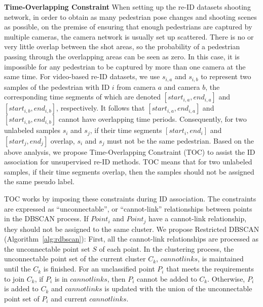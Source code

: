 \documentclass[10pt,twocolumn,letterpaper]{article}
\begin{document}
\noindent \textbf{Time-Overlapping Constraint} 
When setting up the re-ID datasets shooting network, in order to obtain as many pedestrian pose changes and shooting scenes as possible, on the premise of ensuring that enough pedestrians are captured by multiple cameras, the camera network is usually set up scattered. There is no or very little overlap between the shot areas, so the probability of a pedestrian passing through the overlapping areas can be seen as zero. In this case, it is impossible for any pedestrian to be captured by more than one camera at the same time. For video-based re-ID datasets, we use $s_{i,a}$ and $s_{i,b}$ to represent two samples of the pedestrian with ID $i$ from camera $a$ and camera $b$, the corresponding time segments of which are denoted $[start_{i,a}, end_{i,a}]$ and $[start_{i,b}, end_{i,b}]$, respectively. It follows that $[start_{i,a}, end_{i,a}]$ and $[start_{i,b}, end_{i,b}]$ cannot have overlapping time periods. Consequently, for two unlabeled samples $s_i$ and $s_j$, if their time segments $[start_{i}, end_{i}]$ and $[start_{j}, end_{j}]$ overlap, $s_i$ and $s_j$ must not be the same pedestrian. Based on the above analysis, we propose Time-Overlapping Constraint (TOC) to assist the ID association for unsupervised re-ID methods. TOC means that for two unlabeled samples, if their time segments overlap, then the samples should not be assigned the same pseudo label.

TOC works by imposing these constraints during ID association. The constraints are expressed as ``unconnectable'', or ``cannot-link'' relationships between points in the DBSCAN process. If $Point_i$ and $Point_j$ have a cannot-link relationship, they should not be assigned to the same cluster. We propose Restricted DBSCAN (Algorithm~\ref{alg:rdbscan}): First, all the cannot-link relationships are processed as the unconnectable point set $S$ of each point. In the clustering process, the unconnectable point set of the current cluster $C_k$, $cannotlinks$, is maintained until the $C_k$ is finished. For an unclassified point $P_i$ that meets the requirements to join $C_k$, if $P_i$ is in $cannotlinks$, then $P_i$ cannot be added to $C_k$. Otherwise, $P_i$ is added to $C_k$ and $cannotlinks$ is updated with the union of the unconnectable point set of $P_i$ and current $cannotlinks$.
\end{document}
